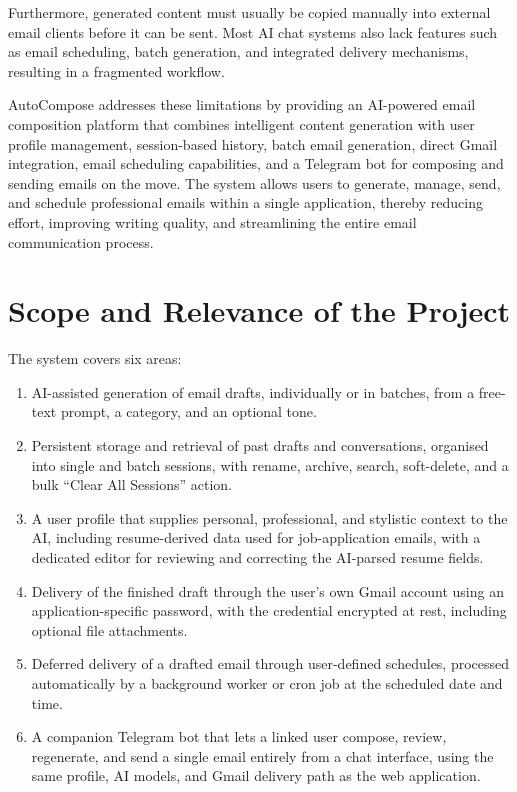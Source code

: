 \documentclass[12pt,a4paper]{article}
\begin{document}
Furthermore, generated content must usually be copied manually into external email clients before it can be sent. Most AI chat systems also lack features such as email scheduling, batch generation, and integrated delivery mechanisms, resulting in a fragmented workflow.

AutoCompose addresses these limitations by providing an AI-powered email composition platform that combines intelligent content generation with user profile management, session-based history, batch email generation, direct Gmail integration, email scheduling capabilities, and a Telegram bot for composing and sending emails on the move. The system allows users to generate, manage, send, and schedule professional emails within a single application, thereby reducing effort, improving writing quality, and streamlining the entire email communication process.


\section{Scope and Relevance of the Project}

The system covers six areas:
\begin{enumerate}[leftmargin=22pt]
  \item AI-assisted generation of email drafts, individually or in batches, from a free-text prompt, a category, and an optional tone.
  \item Persistent storage and retrieval of past drafts and conversations, organised into single and batch sessions, with rename, archive, search, soft-delete, and a bulk ``Clear All Sessions'' action.
  \item A user profile that supplies personal, professional, and stylistic context to the AI, including resume-derived data used for job-application emails, with a dedicated editor for reviewing and correcting the AI-parsed resume fields.
  \item Delivery of the finished draft through the user's own Gmail account using an application-specific password, with the credential encrypted at rest, including optional file attachments.
  \item Deferred delivery of a drafted email through user-defined schedules, processed automatically by a background worker or cron job at the scheduled date and time.
  \item A companion Telegram bot that lets a linked user compose, review, regenerate, and send a single email entirely from a chat interface, using the same profile, AI models, and Gmail delivery path as the web application.
\end{enumerate}
\end{document}
